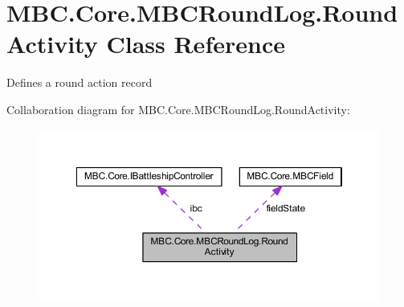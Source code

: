\hypertarget{class_m_b_c_1_1_core_1_1_m_b_c_round_log_1_1_round_activity}{\section{M\-B\-C.\-Core.\-M\-B\-C\-Round\-Log.\-Round\-Activity Class Reference}
\label{class_m_b_c_1_1_core_1_1_m_b_c_round_log_1_1_round_activity}
}


Defines a round action record 




Collaboration diagram for M\-B\-C.\-Core.\-M\-B\-C\-Round\-Log.\-Round\-Activity\-:\nopagebreak
\begin{figure}[H]
\begin{center}
\leavevmode
\includegraphics[width=350pt]{class_m_b_c_1_1_core_1_1_m_b_c_round_log_1_1_round_activity__coll__graph}
\end{center}
\end{figure}
